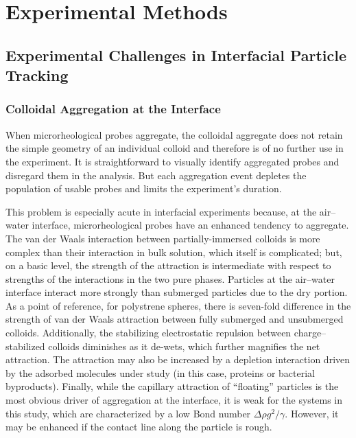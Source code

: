 \chapter{\label{chap:methods}Experimental Methods}

\section{Experimental Challenges in Interfacial Particle Tracking}

\subsection{Colloidal Aggregation at the Interface}

When microrheological probes aggregate, the colloidal aggregate does not retain the simple geometry of an individual colloid and therefore is of no further use in the experiment. It is straightforward to visually identify aggregated probes and disregard them in the analysis. But each aggregation event depletes the population of usable probes and limits the experiment's duration.

This problem is especially acute in interfacial experiments because, at the air--water interface, microrheological probes have an enhanced tendency to aggregate. The van der Waals interaction between partially-immersed colloids is more complex than their interaction in bulk solution, which itself is complicated\cite{Crocker1994}; but, on a basic level, the strength of the attraction is intermediate with respect to strengths of the interactions in the two pure phases. Particles at the air--water interface interact more strongly than submerged particles due to the dry portion. As a point of reference, for polystrene spheres, there is seven-fold difference in the strength of van der Waals attraction between fully submerged and unsubmerged colloids\cite{Williams1991}. Additionally, the stabilizing electrostatic repulsion between charge--stabilized colloids diminishes as it de-wets, which further magnifies the net attraction\cite{Williams1991,Lyne1989}. The attraction may also be increased by a depletion interaction driven by the adsorbed molecules under study (in this case, proteins or bacterial byproducts). Finally, while the capillary attraction of ``floating'' particles is the most obvious driver of aggregation at the interface, it is weak for the systems in this study, which are characterized by a low Bond number $\Delta\rho g^2/\gamma$. However, it may be enhanced if the contact line along the particle is rough.

